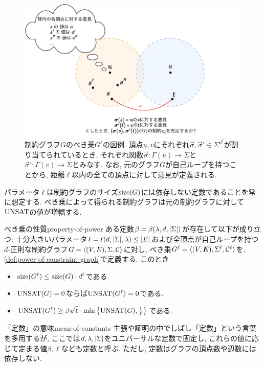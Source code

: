 \begin{figure}[ht]
  \centering
  \includegraphics[width=\textwidth]{images/gap_amplification.pdf}
  \caption{制約グラフ$G$のべき乗$G^\ell$の図例. 頂点$u,v$にそれぞれ$\vec{\sigma},\vec{\sigma}'\in\Sigma^{d^{\ell}}$が割り当てられているとき, それぞれ関数$\vec{\sigma}\colon \Gamma(u)\to\Sigma$と$\vec{\sigma}'\colon \Gamma(v)\to\Sigma$とみなす. なお, 元のグラフ$G$が自己ループを持つことから, 距離$\ell$以内の全ての頂点に対して意見が定義される.\label{fig:gap-amplification}}
\end{figure}

パラメータ$\ell$は制約グラフのサイズ$\mathrm{size}(G)$には依存しない定数であることを常に想定する.
べき乗によって得られる制約グラフは元の制約グラフに対して$\mathrm{UNSAT}$の値が増幅する.

\begin{lemma}{べき乗の性質}{property-of-power}
  ある定数$\beta=\beta(\lambda,d,\abs{\Sigma})$が存在して以下が成り立つ:
  十分大きいパラメータ$\ell=\ell(d,\abs{\Sigma},\lambda) \le \abs{E}$および全頂点が自己ループを持つ$d$-正則な制約グラフ$G=\langle(V,E),\Sigma,\mathcal{C}\rangle$に対し, べき乗$G^\ell = \langle(V,\boldsymbol{E}),\Sigma^{\ell},\mathcal{C}^\ell\rangle$を, \cref{def:power-of-constraint-graph}で定義する.
  このとき
  \begin{itemize}
    \item $\mathrm{size}(G^\ell) \le \mathrm{size}(G)\cdot d^\ell$である.
    \item $\mathrm{UNSAT}(G)=0$ならば$\mathrm{UNSAT}(G^\ell)=0$である.
    \item $\mathrm{UNSAT}(G^\ell) \ge \beta\sqrt{\ell}\cdot \min\qty{ \mathrm{UNSAT}(G), \frac{1}{\ell} }$である.
  \end{itemize}
\end{lemma}

\begin{remark}{「定数」の意味}{mean-of-constants}
  主張や証明の中でしばし「定数」という言葉を多用するが, ここでは$d,\lambda,\abs{\Sigma}$をユニバーサルな定数で固定し, これらの値に応じて定まる値$\beta,\ell$なども定数と呼ぶ.
  ただし, 定数はグラフの頂点数や辺数には依存しない.
\end{remark}

